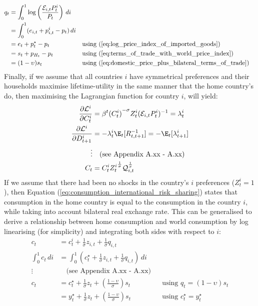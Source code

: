\begin{align}
    q_t               & = \int_{0}^{1} \log \left( \frac{\mathcal{E}_{i,t}P_{t}^i}{P_t} \right) \, di                                                                           \\
    & = \int_{0}^{1} (e_{i,t} + p_{i,t}^i - p_t) \, di                              &  &                                                                      \\
    & = e_t + p_t^{\star} - p_t                                                     &  & \text{using (\ref{eq:log_price_index_of_imported_goods})}            \\
    & = s_t + p_{H_t} - p_t                                                         &  & \text{using (\ref{eq:terms_of_trade_with_world_price_index})}        \\
    & = (1-\upsilon)s_t                                                               &  & \text{using (\ref{eq:domestic_price_plus_bilateral_terms_of_trade})}
\end{align}
Finally, if we assume that all countries $i$ have symmetrical preferences and their households maximise lifetime-utility in the same manner that the home country's do, then maximising the Lagrangian function for country $i$, will yield:
\begin{align}
    \frac{\partial \mathcal{L}^i}{\partial C_t^i} &= \beta^t {(C^i_t)}^{-\sigma} Z^i_t(\mathcal{E}_{i,t}P^i_{t})^{-1} = \lambda^i_t \nonumber\\
    \frac{\partial \mathcal{L}^i}{\partial D_{t+1}^i} & = -\lambda^i_t \E_t[R^{-1}_{t,t+1}] = -\E_t[\lambda^i_{t+1}] \nonumber\\
    \vdots & \quad \text{(see Appendix A.xx - A.xx)} \\
    C_t  &= {C^i_t} {Z^i_t}^{\frac{1}{\sigma}} \mathcal{Q}_{i,t}^{\frac{1}{\sigma}} \label{eq:consumption_international_risk_sharing}
\end{align}
If we assume that there had been no shocks in the country's $i$ preferences ($Z^i_t = 1$), then Equation (\ref{eq:consumption_international_risk_sharing}) states that consumption in the home country is equal to the consumption in the country $i$, while taking into account bilateral real exchange rate. This can be generalised to derive a relationship between home consumption and world consumption by log linearising (for simplicity) and integrating both sides with respect to $i$:
\begin{align}
    c_t &= c_{t}^i + \frac{1}{\sigma}z_{i,t} + \frac{1}{\sigma}q_{i,t} \\
    \int_{0}^{1} c_t \, di & = \int_{0}^{1} \left( c_t^{\star} + \frac{1}{\sigma}z_{i,t} + \frac{1}{\sigma} q_{i,t}\right) \, di \\
    \vdots & \quad \text{(see Appendix A.xx - A.xx)} \\
    c_t & = c_t^{\star} + \frac{1}{\sigma}z_t + \left(\frac{1-\upsilon}{\sigma}\right)s_t \label{eq:link_between_consumption_and_world_consumption} &  & \text{using $q_t=(1-\upsilon)s_t$} \\
    & = y_t^{\star} + \frac{1}{\sigma}z_t + \left(\frac{1-\upsilon}{\sigma}\right)s_t \label{eq:link_between_consumption_and_world_output} &  & \text{using $c^{\star}_t=y^{\star}_t$} 
\end{align}
